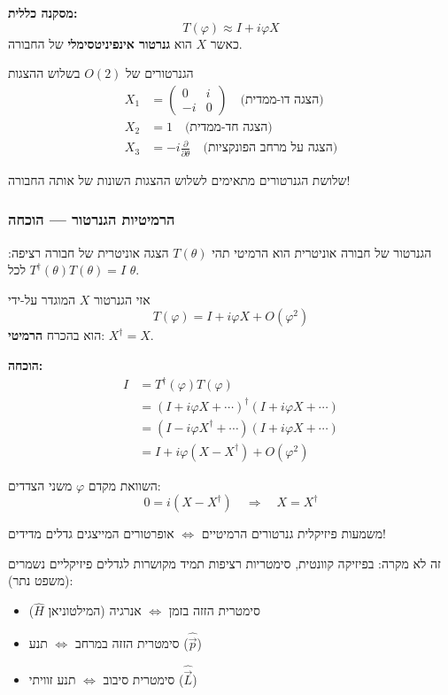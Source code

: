 \textbf{מסקנה כללית:}
\[
\boxed{T(\varphi) \approx I + i\varphi X}
\]
כאשר $X$ הוא \textbf{גנרטור אינפיניטסימלי} של החבורה.


\begin{importantbox}{הגנרטורים של $O(2)$ בשלוש ההצגות}
\begin{align*}
X_1 &= \begin{pmatrix} 0 & i \\ -i & 0 \end{pmatrix} \quad \text{(הצגה דו-ממדית)} \\
X_2 &= 1 \quad \text{(הצגה חד-ממדית)} \\
X_3 &= -i\frac{\partial}{\partial\theta} \quad \text{(הצגה על מרחב הפונקציות)}
\end{align*}

שלושת הגנרטורים מתאימים לשלוש ההצגות השונות של אותה החבורה!
\end{importantbox}

\subsubsection{הרמיטיות הגנרטור — הוכחה}

\begin{theorembox}{הגנרטור של חבורה אוניטרית הוא הרמיטי}
תהי $T(\theta)$ הצגה אוניטרית של חבורה רציפה: $T^\dagger(\theta) T(\theta) = I$ לכל $\theta$.

אזי הגנרטור $X$ המוגדר על-ידי
\[
T(\varphi) = I + i\varphi X + O(\varphi^2)
\]
הוא בהכרח \textbf{הרמיטי}: $X^\dagger = X$.
\end{theorembox}

\textbf{הוכחה:}
\begin{align*}
I &= T^\dagger(\varphi) T(\varphi) \\
&= (I + i\varphi X + \cdots)^\dagger (I + i\varphi X + \cdots) \\
&= (I - i\varphi X^\dagger + \cdots)(I + i\varphi X + \cdots) \\
&= I + i\varphi(X - X^\dagger) + O(\varphi^2)
\end{align*}

השוואת מקדם $\varphi$ משני הצדדים:
\[
0 = i(X - X^\dagger) \quad \Rightarrow \quad \boxed{X = X^\dagger}
\]

\begin{notebox}{משמעות פיזיקלית}
גנרטורים הרמיטיים $\Leftrightarrow$ אופרטורים המייצגים גדלים מדידים!

זה לא מקרה: בפיזיקה קוונטית, סימטריות רציפות תמיד מקושרות לגדלים פיזיקליים נשמרים (משפט נתר):
\begin{itemize}
    \item סימטרית הזזה בזמן $\Leftrightarrow$ אנרגיה (המילטוניאן $\hat{H}$)
    \item סימטרית הזזה במרחב $\Leftrightarrow$ תנע ($\hat{\vec{p}}$)
    \item סימטרית סיבוב $\Leftrightarrow$ תנע זוויתי ($\hat{\vec{L}}$)
\end{itemize}
\end{notebox}

